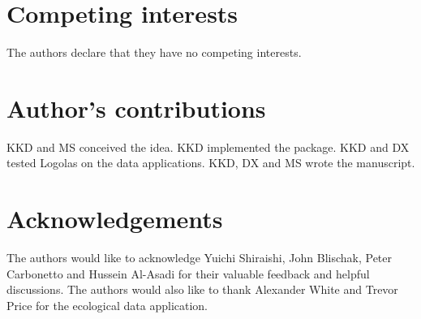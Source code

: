 \documentclass{bmcart}
\begin{document}

\begin{backmatter}

\section*{Competing interests}
  The authors declare that they have no competing interests.

\section*{Author's contributions}
   KKD and MS conceived the idea.  KKD implemented the package. KKD and DX tested Logolas on the data applications. KKD, DX and MS wrote the manuscript. 

\section*{Acknowledgements}
  The authors would like to acknowledge Yuichi Shiraishi, John Blischak, Peter Carbonetto and Hussein Al-Asadi for their valuable feedback and helpful discussions. The authors would also like to thank Alexander White and Trevor Price for the ecological data application. 
  



\end{backmatter}
\end{document}
